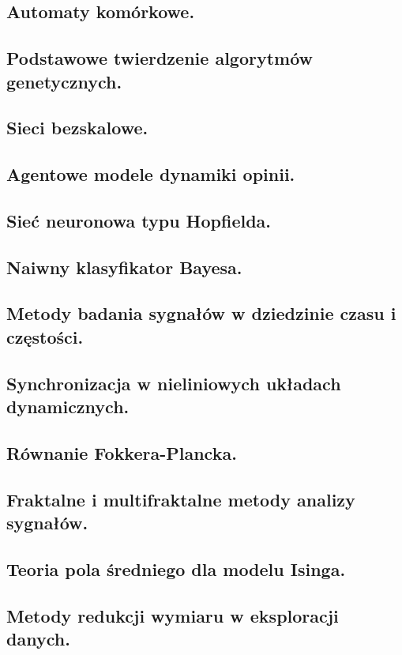 \documentclass[10pt,a4paper]{article} %
\begin{document}
    \subsection{Automaty komórkowe.}
    
    
    \subsection{Podstawowe twierdzenie algorytmów genetycznych.}
    
    
    \subsection{Sieci bezskalowe.}
    
	
	\subsection{Agentowe modele dynamiki opinii.}
	
	
	\subsection{Sieć neuronowa typu Hopfielda.}
	
	
	\subsection{Naiwny klasyfikator Bayesa.}
	
	
	\subsection{Metody badania sygnałów w dziedzinie czasu i częstości.}
	
	
	\subsection{Synchronizacja w nieliniowych układach dynamicznych.}
	
	
	\subsection{Równanie Fokkera-Plancka.}
	
	
	\subsection{Fraktalne i multifraktalne metody analizy sygnałów.}
	
	
	\subsection{Teoria pola średniego dla modelu Isinga.}
	
	
	\subsection{Metody redukcji wymiaru w eksploracji danych.}
	
	
\end{document}
